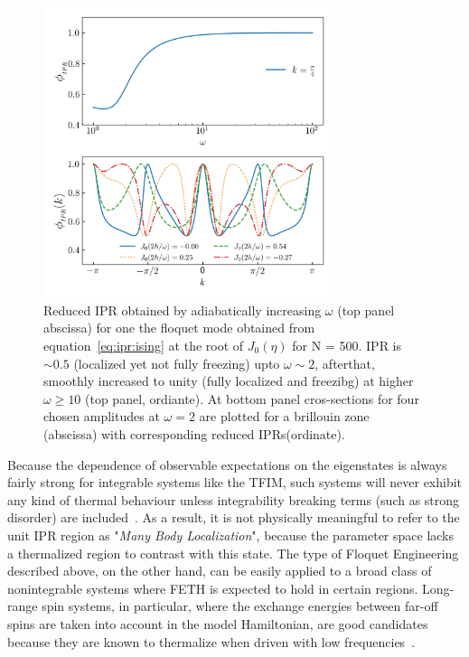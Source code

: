 \documentclass[%
reprint,
superscriptaddress,
amsmath,amssymb,
aps,
prb,
showkeys,
]{revtex4-2}
\begin{document}
	
	
	\begin{figure}[hbt!]
		\centering
		\includegraphics[width = 8.5cm]{ising_exact_lowfr_ipr.jpeg}
		\caption{Reduced IPR obtained by adiabatically increasing $\omega$ (top panel abscissa) for one the floquet mode obtained from equation~\ref{eq:ipr:ising} at the root of $J_0(\eta)$ for N = 500. IPR is $\sim 0.5$ (localized yet not fully freezing) upto $\omega \sim 2$, afterthat, smoothly increased to unity (fully localized and freezibg) at higher $\omega \geq 10$ (top panel, ordiante). At bottom panel cros-sections for four chosen amplitudes at $\omega =2$ are plotted for a brillouin zone (abscissa) with corresponding reduced IPRs(ordinate).}
		\label{fig:ipr:isinglowfrk}
	\end{figure}
	
	Because the dependence of observable expectations on the eigenstates is always fairly strong for integrable systems like the TFIM, such systems will never exhibit any kind of thermal behaviour unless integrability breaking terms (such as strong disorder) are included~\cite{roy_fate_2015}. As a result, it is not physically meaningful to refer to the unit IPR region as "\emph{Many Body Localization}", because the parameter space lacks a thermalized region to contrast with this state. The type of Floquet Engineering described above, on the other hand, can be easily applied to a broad class of nonintegrable systems where FETH is expected to hold in certain regions. Long-range spin systems, in particular, where the exchange energies between far-off spins are taken into account in the model Hamiltonian, are good candidates because they are known to thermalize when driven with low frequencies~\cite{russomanno_thermalization_2015}.
\end{document}
